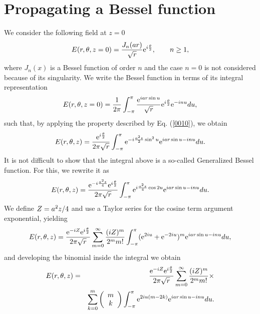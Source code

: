 \documentclass[aps,pra,reprint,superscriptaddress]{revtex4-2}
\begin{document}
\section{Propagating a Bessel function} We  consider  the following field at $z=0$
%
%
\begin{equation}\label{Bess}
   E(r,\theta,z=0)=\frac{J_n(ar)}{\sqrt{r}}\hbox{e}^{i\frac{\theta}{2}}, \qquad n\ge 1,
\end{equation}
%
%
where $J_n(x)$ is a Bessel function of order $n$ and the case $n=0$ is not considered because of its singularity. We write the Bessel function in terms of its integral representation
%
%
\begin{equation}
   E(r,\theta,z=0)=\frac{1}{2\pi}\int_{-\pi}^{\pi}\frac{\hbox{e}^{iar\sin u}}{\sqrt{r}}\hbox{e}^{i\frac{\theta}{2}}\hbox{e}^{-inu}du,
\end{equation}
%
%
such that, by applying the property described by Eq. (\ref{0010}), we obtain
%
%
\begin{equation}
   E(r,\theta,z)=\frac{\hbox{e}^{i\frac{\theta}{2}}}{2\pi\sqrt{r}}\int_{-\pi}^{\pi}\hbox{e}^{{\color{black}-}i\frac{a^2z}{2}\sin^2 u}\hbox{e}^{iar\sin u-inu}du.
\end{equation}
%
%
It is not difficult to show that the integral above is a so-called Generalized Bessel function. For this, we rewrite it as
%
%
\begin{equation}
   E(r,\theta,z)=\frac{\hbox{e}^{{\color{black}-}i\frac{a^2z}{\color{black}4}}\hbox{e}^{i\frac{\theta}{2}}}{2\pi\sqrt{r}}\int_{-\pi}^{\pi}\hbox{e}^{i\frac{a^2z}{4}\cos2 u}\hbox{e}^{iar\sin u-inu}du.
\end{equation}
%
%
We define $Z=a^2z/{\color{black}4}$ and use a Taylor series for the cosine term argument exponential, yielding
%
%
\begin{equation}
   E(r,\theta,z)=\frac{\hbox{e}^{{\color{black}-}iZ}\hbox{e}^{i\frac{\theta}{2}}}{2\pi\sqrt{r}}\sum_{m=0}^{\infty}\frac{(iZ)^m}{2^mm!}\int_{-\pi}^{\pi}(\hbox{e}^{2iu}+\hbox{e}^{-2iu})^m\hbox{e}^{iar\sin u-inu}du,
\end{equation}
%
%
and developing the binomial inside the integral we obtain
%
%
\begin{eqnarray}
   E(r,\theta,z)&=&\frac{\hbox{e}^{{\color{black}-}iZ}\hbox{e}^{i\frac{\theta}{2}}}{2\pi\sqrt{r}}\sum_{m=0}^{\infty}\frac{(iZ)^m}{2^mm!}\times\\ \nonumber &&\sum_{k=0}^m
   \left(\begin{array}{c}
        m\\
        k 
   \end{array}\right)\int_{-\pi}^{\pi}\hbox{e}^{2iu(m-2k)}\hbox{e}^{iar\sin u-inu}du.
\end{eqnarray}
\end{document}
